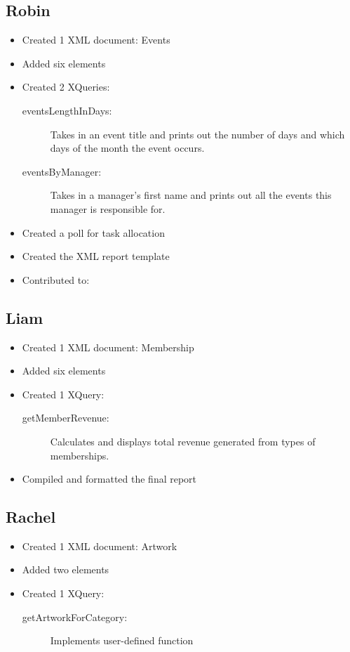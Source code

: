 \documentclass{article} %
\begin{document}
\subsection{Robin}
\begin{itemize}
    \item Created 1 XML document: Events
    \item Added six elements 
    \item Created 2 XQueries:
    \begin{description}
        \item[eventsLengthInDays:] Takes in an event title and prints out the number of days and which days of the month the event occurs.
        \item[eventsByManager:] Takes in a manager's first name and prints out all the events this manager is responsible for.
    \end{description}
    \item Created a poll for task allocation
    \item Created the XML report template
    \item Contributed to:
\end{itemize}

\subsection{Liam}
\begin{itemize}
    \item Created 1 XML document: Membership
    \item Added six elements
    \item Created 1 XQuery: 
    \begin{description}
        \item [getMemberRevenue:] Calculates and displays total revenue generated from types of memberships.
    \end{description}
    \item Compiled and formatted the final report
\end{itemize}

\subsection{Rachel}
\begin{itemize}
    \item Created 1 XML document: Artwork
    \item Added two elements
    \item Created 1 XQuery: 
    \begin{description}
        \item[getArtworkForCategory:] Implements user-defined function
    \end{description}
\end{itemize}
\end{document}
